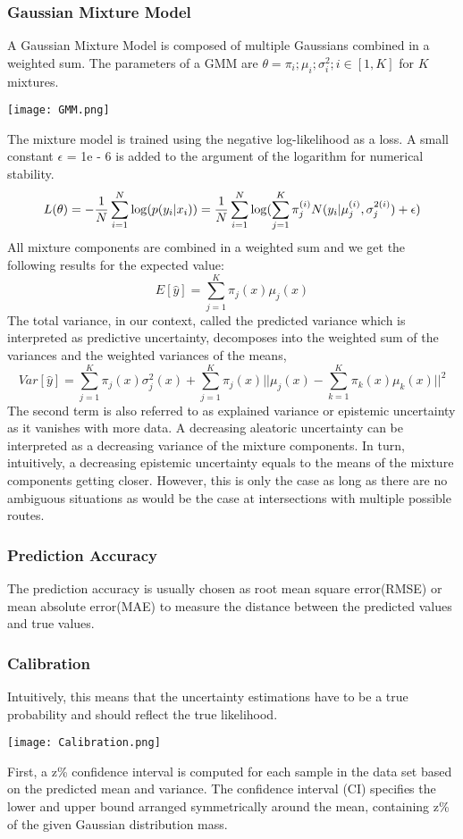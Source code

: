 \documentclass{article}
\begin{document}
\subsubsection{Gaussian Mixture Model}
A Gaussian Mixture Model is composed of multiple Gaussians combined in a weighted sum. The parameters of a GMM are $\theta = \pi_i; \mu_i; \sigma^2_i; i \in [1, K]$ for $K$ mixtures.
\begin{center}
\texttt{[image: GMM.png]}
\end{center}
\noindent The mixture model is trained using the negative log-likelihood as a loss. A small constant 
$\epsilon$ = 1e - 6 is added to the argument of the logarithm for numerical stability.
\[L(\theta)=-\frac{1}{N}\sum_{i=1}^{N}\log(p(y_i|x_i))=\-\frac{1}{N}\sum_{i=1}^{N}\log(\sum_{j=1}^{K}\pi_j^{(i)}N(y_i|\mu_j^{(i)},\sigma_j^{2(i)})+\epsilon)\]
\noindent All mixture components are combined in a weighted sum and we get the following results for the expected value:
\[E[\hat{y}]=\sum_{j=1}^{K}\pi_j(x)\mu_j(x)\]
\noindent The total variance, in our context, called the predicted variance which is interpreted as predictive uncertainty, decomposes into the weighted sum of the variances and the weighted variances of the means,
\[Var[\hat{y}]=\sum_{j=1}^{K}\pi_j(x)\sigma_j^{2}(x)+\sum_{j=1}^{K}\pi_j(x)||\mu_j(x)-\sum_{k=1}^{K}\pi_k(x)\mu_k(x)||^{2}\]
\noindent The second term is also referred to as explained variance or epistemic uncertainty as it vanishes with more data. A decreasing aleatoric uncertainty can be interpreted as a decreasing variance of the mixture components. In turn, intuitively, a decreasing epistemic uncertainty equals to the means of the mixture components getting closer. However, this is only the case as long as there are no ambiguous situations as would be the case at intersections with multiple possible routes.


\subsubsection{Prediction Accuracy}
The prediction accuracy is usually chosen as root mean square error(RMSE) or mean absolute error(MAE) to measure the distance between the predicted values and true values. 
\subsubsection{Calibration}
\noindent Intuitively, this means that the uncertainty estimations have to be a true probability and should reflect the true likelihood.
\begin{center}
\texttt{[image: Calibration.png]}
\end{center}
\noindent First, a z\% confidence interval is computed for each sample in the data set based on the predicted mean and variance. The confidence interval (CI) specifies the lower and upper bound arranged symmetrically around the mean, containing z\% of the given Gaussian distribution mass.
\end{document}
